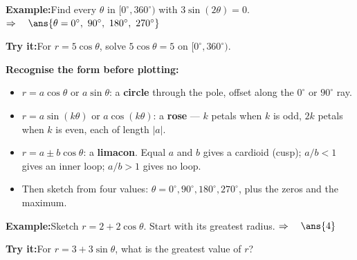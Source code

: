 \documentclass[12pt]{article}
\begin{document}
\begin{examplebox}
\textbf{Example:}\quad Find every $\theta$ in $[0^\circ, 360^\circ)$ with
$3\sin(2\theta) = 0$.
$\Rightarrow\quad \ans{\theta = 0^\circ,\ 90^\circ,\ 180^\circ,\ 270^\circ}$
\end{examplebox}

\begin{tryitbox}
\textbf{Try it:}\quad For $r = 5\cos\theta$, solve $5\cos\theta = 5$ on
$[0^\circ, 360^\circ)$.\\[2pt]
\end{tryitbox}


\begin{formulabox}
\textbf{Recognise the form before plotting:}
\begin{itemize}[leftmargin=0.8cm, itemsep=1pt, topsep=2pt]
  \item $r = a\cos\theta$ or $a\sin\theta$: a \textbf{circle} through the pole,
        offset along the $0^\circ$ or $90^\circ$ ray.
  \item $r = a\sin(k\theta)$ or $a\cos(k\theta)$: a \textbf{rose} --- $k$ petals when
        $k$ is odd, $2k$ petals when $k$ is even, each of length $|a|$.
  \item $r = a \pm b\cos\theta$: a \textbf{limacon}. Equal $a$ and $b$ gives a
        cardioid (cusp); $a/b < 1$ gives an inner loop; $a/b > 1$ gives no loop.
  \item Then sketch from four values: $\theta = 0^\circ, 90^\circ, 180^\circ,
        270^\circ$, plus the zeros and the maximum.
\end{itemize}
\end{formulabox}

\begin{examplebox}
\textbf{Example:}\quad Sketch $r = 2 + 2\cos\theta$. Start with its greatest radius.
$\Rightarrow\quad \ans{4}$
\end{examplebox}

\begin{tryitbox}
\textbf{Try it:}\quad For $r = 3 + 3\sin\theta$, what is the greatest value of $r$?\\[2pt]
\end{tryitbox}
\end{document}
